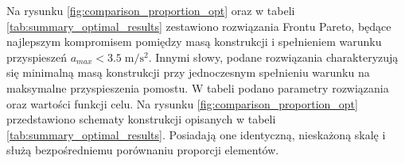 Na rysunku \ref{fig:comparison_proportion_opt} oraz w tabeli \ref{tab:summary_optimal_results} zestawiono rozwiązania Frontu Pareto, będące najlepszym kompromisem pomiędzy masą konstrukcji i spełnieniem warunku przyspieszeń $a_{max}<3.5\;\mathrm{m/s^2}$. Innymi słowy, podane rozwiązania charakteryzują się minimalną masą konstrukcji przy jednoczesnym spełnieniu warunku na maksymalne przyspieszenia pomostu. W tabeli podano parametry rozwiązania oraz wartości funkcji celu. Na rysunku \ref{fig:comparison_proportion_opt} przedstawiono schematy konstrukcji opisanych w tabeli \ref{tab:summary_optimal_results}. Posiadają one identyczną, nieskażoną skalę i służą bezpośredniemu porównaniu proporcji elementów.






